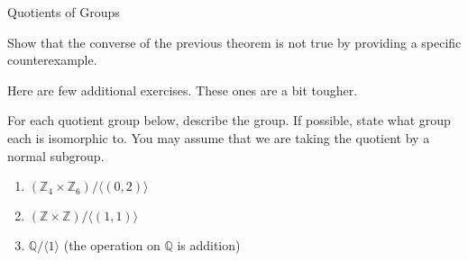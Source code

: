 \begin{section}{Quotients of Groups}
\begin{problem}
Show that the converse of the previous theorem is not true by providing a specific counterexample.
\end{problem}

Here are few additional exercises.  These ones are a bit tougher.

\begin{exercise}
For each quotient group below, describe the group.  If possible, state what group each is isomorphic to.  You may assume that we are taking the quotient by a normal subgroup. 
\begin{enumerate}[label=\rm{(\alph*)}]
\item $(\mathbb{Z}_4\times \mathbb{Z}_6)/\langle (0,2)\rangle$
\item $(\mathbb{Z}\times \mathbb{Z})/\langle (1,1)\rangle$
\item $\mathbb{Q}/\langle 1\rangle$ (the operation on $\mathbb{Q}$ is addition)
\end{enumerate}
\end{exercise}

\end{section}